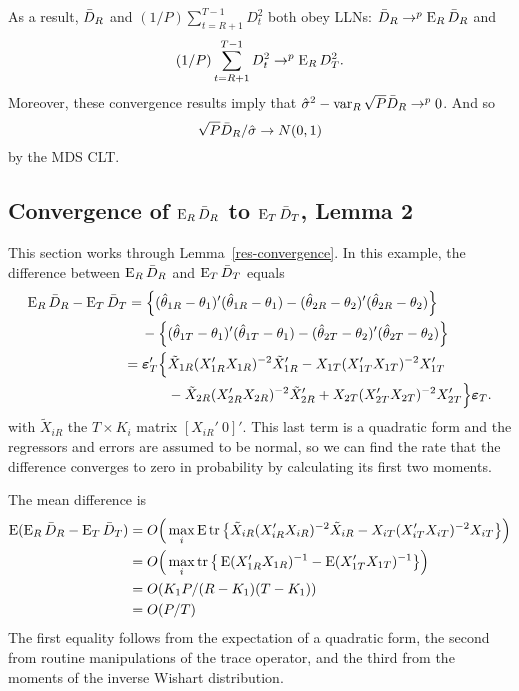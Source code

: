 As a result, $\bar{D}_{R}$ and $(1/P) \sum_{t=R+1}^{T-1} D_t^2$ both obey
LLNs: $\bar{D}_{R} \to^p \operatorname{E}_R \bar{D}_{R}$ and
\begin{equation*}
  (1/P) \sum_{t=R+1}^{T-1} D_t^2 \to^p \operatorname{E}_R D_T^2.
\end{equation*}
Moreover, these convergence results imply that $\hat{\sigma}^2 - \operatorname{var}_R
\sqrt{P} \bar{D}_{R} \to^p 0$. And so
\begin{equation*}
  \sqrt{P} \bar{D}_{R}/\hat{\sigma} \to N(0,1)
\end{equation*}
by the MDS CLT.

\subsection{Convergence of $\operatorname{E}_R \bar{D}_{R}$ to $\operatorname{E}_T \bar{D}_{T}$, Lemma 2}

This section works through Lemma~\ref{res-convergence}. In this
example, the difference between $\operatorname{E}_R \bar{D}_{R}$ and $\operatorname{E}_T \bar{D}_{T}$ equals
\begin{equation*}
  \begin{split}
    \operatorname{E}_R \bar{D}_{R} - \operatorname{E}_T \bar{D}_{T} &= \Big\{(\hat\theta_{1R} - \theta_1)'(\hat\theta_{1R} -
    \theta_1) -
    (\hat\theta_{2R} - \theta_2)'(\hat\theta_{2R} - \theta_2)\Big\} \\
    & \quad - \Big\{(\hat\theta_{1T} - \theta_1)'(\hat\theta_{1T} - \theta_1) -
    (\hat\theta_{2T} - \theta_2)'(\hat\theta_{2T} - \theta_2)\Big\} \\
    &\begin{split}
      =\boldsymbol{\varepsilon}_{T}'\Big\{
      & \tilde{X}_{1R}(X_{1R}'X_{1R})^{-2} \tilde{X}_{1R}'
      - X_{1T}(X_{1T}'X_{1T})^{-2} X_{1T}' \\
      & - \tilde{X}_{2R}(X_{2R}'X_{2R})^{-2} \tilde{X}_{2R}'
      + X_{2T}(X_{2T}'X_{2T})^{-2} X_{2T}'
      \Big\}\boldsymbol{\varepsilon}_{T}.
    \end{split}
  \end{split}
\end{equation*}
with $\tilde{X}_{iR}$ the $T \times K_i$ matrix $[X_{iR}'\ 0]'$. This
last term is a quadratic form and the regressors and errors are
assumed to be normal, so we can find the rate that the difference
converges to zero in probability by calculating its first two moments.

The mean difference is
\begin{equation*}
  \begin{split}
  \operatorname{E}(\operatorname{E}_R \bar{D}_{R} - \operatorname{E}_T \bar{D}_{T})
      &=O\Big(\max_i \operatorname{E} \operatorname{tr} \big\{
        \tilde{X}_{iR}(X_{iR}'X_{iR})^{-2} \tilde{X}_{iR}
        - X_{iT}(X_{iT}'X_{iT})^{-2} X_{iT} \big\} \Big) \\
      &=O\Big(\max_i \operatorname{tr} \big\{\operatorname{E} (X_{1R}'X_{1R})^{-1}
         - \operatorname{E} (X_{1T}'X_{1T})^{-1} \big\}\Big) \\
      &=O( K_1 P / (R-K_1)(T-K_1)) \\
      &=O(P/T)
    \end{split}
\end{equation*}
The first equality follows from the expectation of a quadratic form,
the second from routine manipulations of the trace operator, and the
third from the moments of the inverse Wishart distribution.

